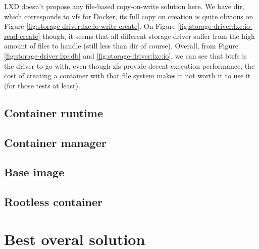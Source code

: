 LXD doesn't propose any file-based copy-on-write solution here.  We have dir, which corresponds to vfs for Docker, its full copy on creation is quite obvious on Figure \ref{fig:storage-driver:lxc:io-write-create}.  On Figure \ref{fig:storage-driver:lxc:io-read-create} though, it seems that all different storage driver suffer from the high amount of files to handle (still less than dir of course).  Overall, from Figure \ref{fig:storage-driver:lxc:db} and \ref{fig:storage-driver:lxc:io}, we can see that btrfs is the driver to go with, even though zfs provide decent execution performance, the cost of creating a container with that file system makes it not worth it to use it (for those tests at least).

\subsection{Container runtime}



\subsection{Container manager}

\subsection{Base image}

\subsection{Rootless container}

\section{Best overal solution}
